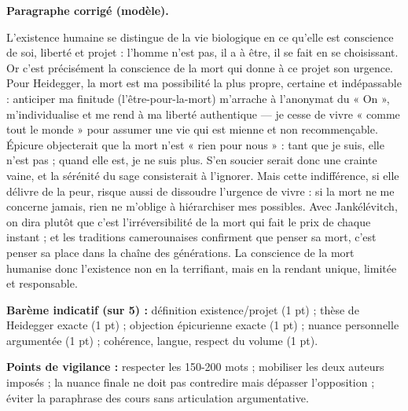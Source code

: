 \documentclass[11pt]{article}
\begin{document}
\begin{corrige}
\textbf{Paragraphe corrigé (modèle).}

L'existence humaine se distingue de la vie biologique en ce qu'elle est conscience de soi, liberté et projet : l'homme n'est pas, il a à être, il se fait en se choisissant. Or c'est précisément la conscience de la mort qui donne à ce projet son urgence. Pour Heidegger, la mort est ma possibilité la plus propre, certaine et indépassable : anticiper ma finitude (l'être-pour-la-mort) m'arrache à l'anonymat du « On », m'individualise et me rend à ma liberté authentique — je cesse de vivre « comme tout le monde » pour assumer une vie qui est mienne et non recommençable. Épicure objecterait que la mort n'est « rien pour nous » : tant que je suis, elle n'est pas ; quand elle est, je ne suis plus. S'en soucier serait donc une crainte vaine, et la sérénité du sage consisterait à l'ignorer. Mais cette indifférence, si elle délivre de la peur, risque aussi de dissoudre l'urgence de vivre : si la mort ne me concerne jamais, rien ne m'oblige à hiérarchiser mes possibles. Avec Jankélévitch, on dira plutôt que c'est l'irréversibilité de la mort qui fait le prix de chaque instant ; et les traditions camerounaises confirment que penser sa mort, c'est penser sa place dans la chaîne des générations. La conscience de la mort humanise donc l'existence non en la terrifiant, mais en la rendant unique, limitée et responsable.

\textbf{Barème indicatif (sur 5) :} définition existence/projet (1 pt) ; thèse de Heidegger exacte (1 pt) ; objection épicurienne exacte (1 pt) ; nuance personnelle argumentée (1 pt) ; cohérence, langue, respect du volume (1 pt).

\textbf{Points de vigilance :} respecter les 150-200 mots ; mobiliser les deux auteurs imposés ; la nuance finale ne doit pas contredire mais dépasser l'opposition ; éviter la paraphrase des cours sans articulation argumentative.
\end{corrige}
\end{document}
